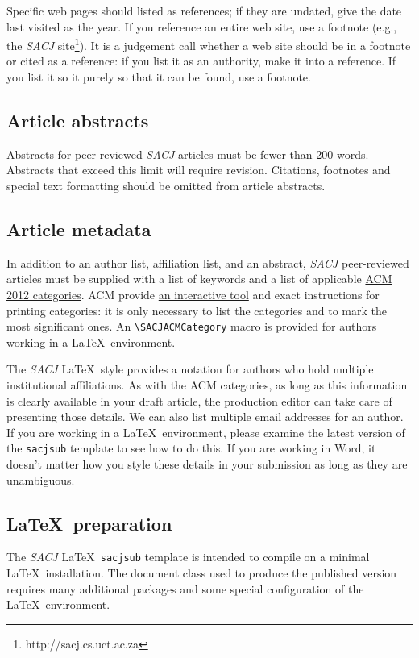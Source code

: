 \documentclass{article}
\begin{document}
Specific web pages should listed as references; if they are undated, give the date last visited as the year.  If you reference an entire web site, use a footnote (e.g., the {\em SACJ} site\footnote{http://sacj.cs.uct.ac.za}). It is a judgement call whether a web site should be in a footnote or cited as a reference: if you list it as an authority, make it into a reference. If you list it so it purely so that it can be found, use a footnote.

\subsection{Article abstracts}
Abstracts for peer-reviewed {\em SACJ} articles must be fewer than 200 words. Abstracts that exceed this limit will require revision. Citations, footnotes and special text formatting should be omitted from article abstracts.

\subsection{Article metadata}
In addition to an author list, affiliation list, and an abstract, {\em SACJ} peer-reviewed articles must be supplied with a list of keywords and a list of applicable \href{https://dl.acm.org/ccs/ccs.cfm?}{ACM 2012 categories}. ACM provide \href{http://dl.acm.org/ccs/ccs.cfm}{an interactive tool} and exact instructions for printing categories: it is only necessary to list the categories and to mark the most significant ones. An \verb"\SACJACMCategory" macro is provided for authors working in a \LaTeX~environment. 

The {\em SACJ} \LaTeX~style provides a notation for authors who hold multiple institutional affiliations. As with the ACM categories, as long as this information is clearly available in your draft article, the production editor can take care of presenting those details. We can also list multiple email addresses for an author. If you are working in a \LaTeX~environment, please examine the latest version of the \verb"sacjsub" template to see how to do this. If you are working in Word, it doesn't matter how you style these details in your submission as long as they are unambiguous. 

\subsection{\LaTeX~preparation}
The {\em SACJ} \LaTeX~\verb"sacjsub" template is intended to compile on a minimal \LaTeX~installation. The document class used to produce the published version requires many additional packages and some special configuration of the \LaTeX~environment.
\end{document}
